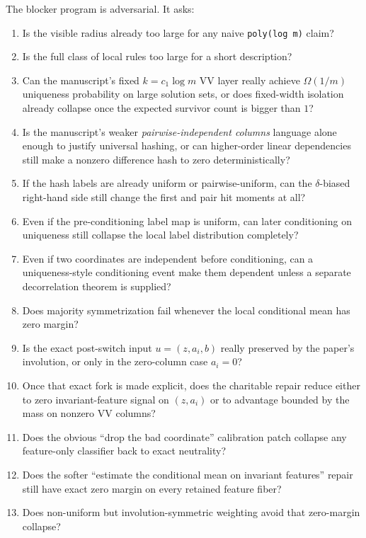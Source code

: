 \documentclass[11pt]{article}
\theoremstyle{remark}
\begin{document}
The blocker program is adversarial.  It asks:
\begin{enumerate}[leftmargin=1.5em]
  \item Is the visible radius already too large for any naive \texttt{poly(log m)} claim?
  \item Is the full class of local rules too large for a short description?
  \item Can the manuscript's fixed \(k=c_1\log m\) VV layer really achieve \(\Omega(1/m)\)
  uniqueness probability on large solution sets, or does fixed-width isolation already collapse
  once the expected survivor count is bigger than \(1\)?
  \item Is the manuscript's weaker \emph{pairwise-independent columns} language alone enough to
  justify universal hashing, or can higher-order linear dependencies still make a nonzero
  difference hash to zero deterministically?
  \item If the hash labels are already uniform or pairwise-uniform, can the \(\delta\)-biased
  right-hand side still change the first and pair hit moments at all?
  \item Even if the pre-conditioning label map is uniform, can later conditioning on uniqueness
  still collapse the local label distribution completely?
  \item Even if two coordinates are independent before conditioning, can a uniqueness-style
  conditioning event make them dependent unless a separate decorrelation theorem is supplied?
  \item Does majority symmetrization fail whenever the local conditional mean has zero margin?
  \item Is the exact post-switch input \(u=(z,a_i,b)\) really preserved by the paper's involution,
  or only in the zero-column case \(a_i=0\)?
  \item Once that exact fork is made explicit, does the charitable repair reduce either to zero
  invariant-feature signal on \((z,a_i)\) or to advantage bounded by the mass on nonzero VV columns?
  \item Does the obvious ``drop the bad coordinate'' calibration patch collapse any feature-only
  classifier back to exact neutrality?
  \item Does the softer ``estimate the conditional mean on invariant features'' repair still have
  exact zero margin on every retained feature fiber?
  \item Does non-uniform but involution-symmetric weighting avoid that zero-margin collapse?

\end{enumerate}
\end{document}
